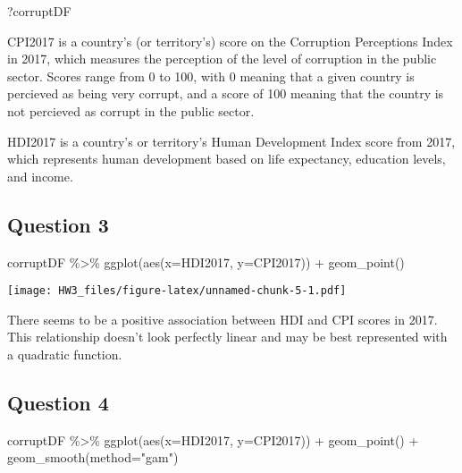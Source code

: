 \documentclass[
]{article}
\newenvironment{Shaded}{\begin{snugshade}}{\end{snugshade}}
\newcommand{\AttributeTok}[1]{\textcolor[rgb]{0.77,0.63,0.00}{#1}}
\newcommand{\FunctionTok}[1]{\textcolor[rgb]{0.00,0.00,0.00}{#1}}
\newcommand{\NormalTok}[1]{#1}
\newcommand{\SpecialCharTok}[1]{\textcolor[rgb]{0.00,0.00,0.00}{#1}}
\newcommand{\StringTok}[1]{\textcolor[rgb]{0.31,0.60,0.02}{#1}}
\begin{document}
\begin{Shaded}
\begin{Highlighting}[]
\NormalTok{?corruptDF}
\end{Highlighting}
\end{Shaded}

CPI2017 is a country's (or territory's) score on the Corruption
Perceptions Index in 2017, which measures the perception of the level of
corruption in the public sector. Scores range from 0 to 100, with 0
meaning that a given country is percieved as being very corrupt, and a
score of 100 meaning that the country is not percieved as corrupt in the
public sector.

HDI2017 is a country's or territory's Human Development Index score from
2017, which represents human development based on life expectancy,
education levels, and income.

\hypertarget{question-3}{%
\subsection{Question 3}\label{question-3}}

\begin{Shaded}
\begin{Highlighting}[]
\NormalTok{corruptDF }\SpecialCharTok{\%\textgreater{}\%} 
  \FunctionTok{ggplot}\NormalTok{(}\FunctionTok{aes}\NormalTok{(}\AttributeTok{x=}\NormalTok{HDI2017,}
             \AttributeTok{y=}\NormalTok{CPI2017)) }\SpecialCharTok{+}
  \FunctionTok{geom\_point}\NormalTok{()}
\end{Highlighting}
\end{Shaded}

\texttt{[image: HW3\_files/figure-latex/unnamed-chunk-5-1.pdf]}

There seems to be a positive association between HDI and CPI scores in
2017. This relationship doesn't look perfectly linear and may be best
represented with a quadratic function.

\hypertarget{question-4}{%
\subsection{Question 4}\label{question-4}}

\begin{Shaded}
\begin{Highlighting}[]
\NormalTok{corruptDF }\SpecialCharTok{\%\textgreater{}\%} 
  \FunctionTok{ggplot}\NormalTok{(}\FunctionTok{aes}\NormalTok{(}\AttributeTok{x=}\NormalTok{HDI2017,}
             \AttributeTok{y=}\NormalTok{CPI2017)) }\SpecialCharTok{+}
  \FunctionTok{geom\_point}\NormalTok{() }\SpecialCharTok{+}
  \FunctionTok{geom\_smooth}\NormalTok{(}\AttributeTok{method=}\StringTok{"gam"}\NormalTok{)}
\end{Highlighting}
\end{Shaded}
\end{document}
